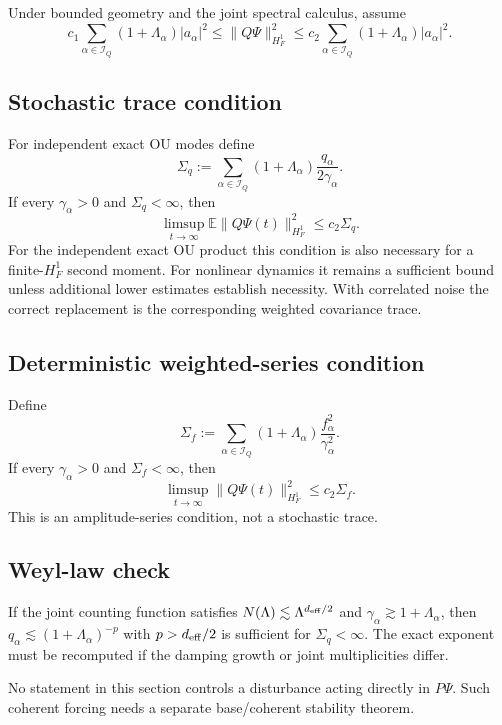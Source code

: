 \documentclass[11pt]{article}
\begin{document}
Under bounded geometry and the joint spectral calculus, assume
\begin{equation}
c_1\sum_{\alpha\in\mathcal I_Q}(1+\Lambda_\alpha)|a_\alpha|^2
\le\|Q\Psi\|_{H_F^1}^2
\le c_2\sum_{\alpha\in\mathcal I_Q}(1+\Lambda_\alpha)|a_\alpha|^2.
\label{eq:joint-sobolev}
\end{equation}

\subsection{Stochastic trace condition}

For independent exact OU modes define
\[
\Sigma_q:=\sum_{\alpha\in\mathcal I_Q}
(1+\Lambda_\alpha)\frac{q_\alpha}{2\gamma_\alpha}.
\]
If every $\gamma_\alpha>0$ and $\Sigma_q<\infty$, then
\[
\limsup_{t\to\infty}\mathbb E\|Q\Psi(t)\|_{H_F^1}^2
\le c_2\Sigma_q.
\]
For the independent exact OU product this condition is also necessary for a
finite-$H_F^1$ second moment. For nonlinear dynamics it remains a sufficient
bound unless additional lower estimates establish necessity. With correlated
noise the correct replacement is the corresponding weighted covariance trace.

\subsection{Deterministic weighted-series condition}

Define
\[
\Sigma_f:=\sum_{\alpha\in\mathcal I_Q}
(1+\Lambda_\alpha)\frac{f_\alpha^2}{\gamma_\alpha^2}.
\]
If every $\gamma_\alpha>0$ and $\Sigma_f<\infty$, then
\[
\limsup_{t\to\infty}\|Q\Psi(t)\|_{H_F^1}^2
\le c_2\Sigma_f.
\]
This is an amplitude-series condition, not a stochastic trace.

\subsection{Weyl-law check}

If the joint counting function satisfies
$N(\Lambda)\lesssim\Lambda^{d_{\rm eff}/2}$ and
$\gamma_\alpha\gtrsim1+\Lambda_\alpha$, then
$q_\alpha\lesssim(1+\Lambda_\alpha)^{-p}$ with
$p>d_{\rm eff}/2$ is sufficient for $\Sigma_q<\infty$. The exact exponent must
be recomputed if the damping growth or joint multiplicities differ.

No statement in this section controls a disturbance acting directly in
$P\Psi$. Such coherent forcing needs a separate base/coherent stability
theorem.
\end{document}
